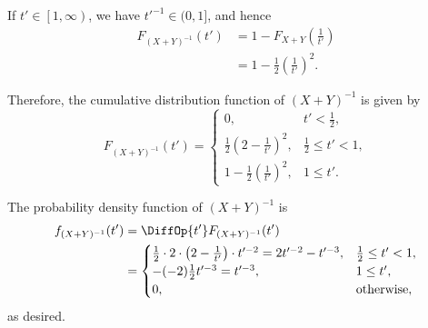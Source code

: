 \begin{enumerate}
          If \(t' \in \left[1, \infty\right)\), we have \(t'^{-1} \in (0, 1]\), and hence
          \begin{align*}
              F_{(X + Y)^{-1}}(t') & = 1 - F_{X + Y}\left(\frac{1}{t'}\right)       \\
                                   & = 1 - \frac{1}{2} \left(\frac{1}{t'}\right)^2.
          \end{align*}

          Therefore, the cumulative distribution function of \((X + Y)^{-1}\) is given by
          \[
              F_{(X + Y)^{-1}}(t') = \begin{cases}
                  0,                                           & t' < \frac{1}{2},        \\
                  \frac{1}{2} \left(2 - \frac{1}{t'}\right)^2, & \frac{1}{2} \leq t' < 1, \\
                  1 - \frac{1}{2} \left(\frac{1}{t'}\right)^2, & 1 \leq t'.
              \end{cases}
          \]

          The probability density function of \((X + Y)^{-1}\) is
          \begin{align*}
              f_{(X + Y)^{-1}}(t') & = \DiffOp{t'} F_{(X + Y)^{-1}}(t')                                                                                        \\
                                   & = \begin{cases}
                                           \frac{1}{2} \cdot 2 \cdot \left(2 - \frac{1}{t'}\right) \cdot t'^{-2} = 2 t'^{-2} - t'^{-3}, & \frac{1}{2} \leq t' < 1, \\
                                           -(-2)\frac{1}{2} t'^{-3} = t'^{-3},                                                          & 1 \leq t',               \\
                                           0,                                                                                           & \text{otherwise},
                                       \end{cases}
          \end{align*}
          as desired.


\end{enumerate}
